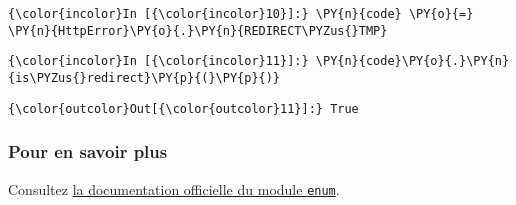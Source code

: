     \begin{Verbatim}[commandchars=\\\{\},frame=single,framerule=0.3mm,rulecolor=\color{cellframecolor}]
{\color{incolor}In [{\color{incolor}10}]:} \PY{n}{code} \PY{o}{=} \PY{n}{HttpError}\PY{o}{.}\PY{n}{REDIRECT\PYZus{}TMP}
\end{Verbatim}


    \begin{Verbatim}[commandchars=\\\{\},frame=single,framerule=0.3mm,rulecolor=\color{cellframecolor}]
{\color{incolor}In [{\color{incolor}11}]:} \PY{n}{code}\PY{o}{.}\PY{n}{is\PYZus{}redirect}\PY{p}{(}\PY{p}{)}
\end{Verbatim}


\begin{Verbatim}[commandchars=\\\{\},frame=single,framerule=0.3mm,rulecolor=\color{cellframecolor}]
{\color{outcolor}Out[{\color{outcolor}11}]:} True
\end{Verbatim}
            
    \hypertarget{pour-en-savoir-plus}{%
\subsubsection{Pour en savoir plus}\label{pour-en-savoir-plus}}

Consultez \href{https://docs.python.org/3/library/enum.html}{la
documentation officielle du module \texttt{enum}}.


    
    
    
